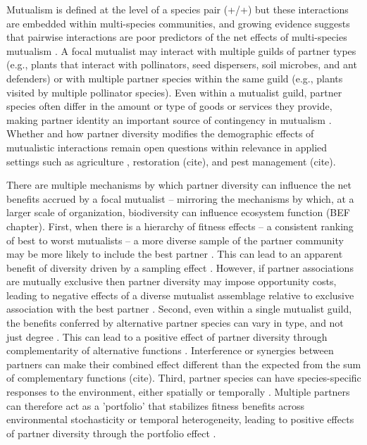 \documentclass[11pt]{article}
\begin{document}
Mutualism is defined at the level of a species pair (+/+) but these interactions are embedded within multi-species communities, and growing evidence suggests that pairwise interactions are poor predictors of the net effects of multi-species mutualism \citep{Afkhami2014,Palmer2010}. 
A focal mutualist may interact with multiple guilds of partner types (e.g., plants that interact with pollinators, seed dispersers, soil microbes, and ant defenders) or with multiple partner species within the same guild (e.g., plants visited by multiple pollinator species). 
Even within a mutualist guild, partner species often differ in the amount or type of goods or services they provide, making partner identity an important source of contingency in mutualism \citep{Stanton2003}. 
Whether and how partner diversity modifies the demographic effects of mutualistic interactions remain open questions within relevance in applied settings such as agriculture \citep{rogers2014bee}, restoration (cite), and pest management (cite). 

There are multiple mechanisms by which partner diversity can influence the net benefits accrued by a focal mutualist -- mirroring the mechanisms by which, at a larger scale of organization, biodiversity can influence ecosystem function (BEF chapter). 
First, when there is a hierarchy of fitness effects -- a consistent ranking of best to worst mutualists -- a more diverse sample of the partner community may be more likely to include the best partner \cite{Frederickson2013}.
This can lead to an apparent benefit of diversity driven by a sampling effect \cite{Batstone2018}. 
However, if partner associations are mutually exclusive then partner diversity may impose opportunity costs, leading to negative effects of a diverse mutualist assemblage relative to exclusive association with the best partner \citep{Miller2007}. 
Second, even within a single mutualist guild, the benefits conferred by alternative partner species can vary in type, and not just degree \cite{Stachowicz2005,Bronstein2006,Stanton2003}. 
This can lead to a positive effect of partner diversity through complementarity of alternative functions \cite{Batstone2018}. 
Interference or synergies between partners can make their combined effect different than the expected from the sum of complementary functions (cite). 
Third, partner species can have species-specific responses to the environment, either spatially \citep{Ollerton2006} or temporally \citep{Alarcon2008}. 
Multiple partners can therefore act as a 'portfolio' that stabilizes fitness benefits across environmental stochasticity or temporal heterogeneity, leading to positive effects of partner diversity through the portfolio effect \cite{Batstone2018,Lazaro2022}. 
\end{document}
